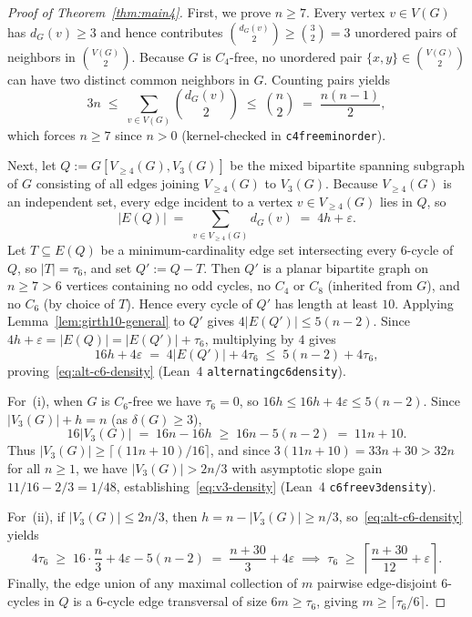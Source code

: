 \documentclass[11pt,reqno]{amsart}
\theoremstyle{plain}
\theoremstyle{definition}
\theoremstyle{remark}
\newcommand{\Vge}{V_{\ge 4}}
\DeclareRobustCommand{\_}{\ifmmode\text{\textunderscore}\else\textunderscore\allowbreak\fi}
\begin{document}
\begin{proof}[Proof of Theorem~\ref{thm:main4}]
First, we prove $n \ge 7$. Every vertex $v \in V(G)$ has $d_G(v) \ge 3$ and hence contributes $\binom{d_G(v)}{2} \ge \binom{3}{2} = 3$ unordered pairs of neighbors in $\binom{V(G)}{2}$. Because $G$ is $C_4$-free, no unordered pair $\{x, y\} \in \binom{V(G)}{2}$ can have two distinct common neighbors in $G$. Counting pairs yields
\[
  3 n \;\le\; \sum_{v \in V(G)} \binom{d_G(v)}{2} \;\le\; \binom{n}{2} \;=\; \frac{n(n - 1)}{2},
\]
which forces $n \ge 7$ since $n > 0$ (kernel-checked in \texttt{c4\_free\_min\_order}).

Next, let $Q := G[\Vge(G), V_3(G)]$ be the mixed bipartite spanning subgraph of $G$ consisting of all edges joining $\Vge(G)$ to $V_3(G)$. Because $\Vge(G)$ is an independent set, every edge incident to a vertex $v \in \Vge(G)$ lies in $Q$, so
\[
  |E(Q)| \;=\; \sum_{v \in \Vge(G)} d_G(v) \;=\; 4 h + \varepsilon.
\]
Let $T \subseteq E(Q)$ be a minimum-cardinality edge set intersecting every $6$-cycle of $Q$, so $|T| = \tau_6$, and set $Q' := Q - T$. Then $Q'$ is a planar bipartite graph on $n \ge 7 > 6$ vertices containing no odd cycles, no $C_4$ or $C_8$ (inherited from $G$), and no $C_6$ (by choice of $T$). Hence every cycle of $Q'$ has length at least $10$. Applying Lemma~\ref{lem:girth10-general} to $Q'$ gives $4|E(Q')| \le 5(n - 2)$. Since $4h + \varepsilon = |E(Q)| = |E(Q')| + \tau_6$, multiplying by $4$ gives
\[
  16 h + 4 \varepsilon \;=\; 4|E(Q')| + 4\tau_6 \;\le\; 5(n - 2) + 4\tau_6,
\]
proving~\eqref{eq:alt-c6-density} (Lean~4 \texttt{alternating\_c6\_density}).

For~(i), when $G$ is $C_6$-free we have $\tau_6 = 0$, so $16 h \le 16 h + 4\varepsilon \le 5(n - 2)$. Since $|V_3(G)| + h = n$ (as $\delta(G) \ge 3$),
\[
  16 |V_3(G)| \;=\; 16 n - 16 h \;\ge\; 16 n - 5(n - 2) \;=\; 11 n + 10.
\]
Thus $|V_3(G)| \ge \lceil(11n + 10)/16\rceil$, and since $3(11n + 10) = 33n + 30 > 32n$ for all $n \ge 1$, we have $|V_3(G)| > 2n/3$ with asymptotic slope gain $11/16 - 2/3 = 1/48$, establishing~\eqref{eq:v3-density} (Lean~4 \texttt{c6\_free\_v3\_density}).

For~(ii), if $|V_3(G)| \le 2n/3$, then $h = n - |V_3(G)| \ge n/3$, so~\eqref{eq:alt-c6-density} yields
\[
  4 \tau_6 \;\ge\; 16 \cdot \frac{n}{3} + 4 \varepsilon - 5(n - 2) \;=\; \frac{n + 30}{3} + 4 \varepsilon
  \;\implies\; \tau_6 \;\ge\; \left\lceil \frac{n + 30}{12} + \varepsilon \right\rceil.
\]
Finally, the edge union of any maximal collection of $m$ pairwise edge-disjoint $6$-cycles in $Q$ is a $6$-cycle edge transversal of size $6m \ge \tau_6$, giving $m \ge \lceil \tau_6 / 6 \rceil$.
\end{proof}
\end{document}
